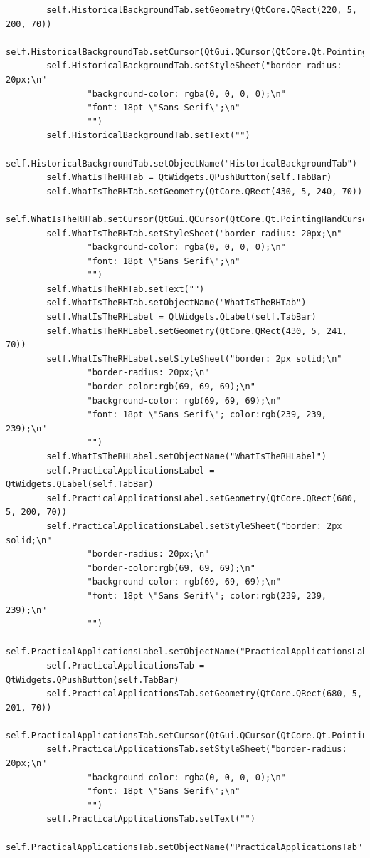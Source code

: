 \documentclass[12pt]{article}
\begin{document}
\begin{lstlisting}
        self.HistoricalBackgroundTab.setGeometry(QtCore.QRect(220, 5, 200, 70))
        self.HistoricalBackgroundTab.setCursor(QtGui.QCursor(QtCore.Qt.PointingHandCursor))
        self.HistoricalBackgroundTab.setStyleSheet("border-radius: 20px;\n"
                "background-color: rgba(0, 0, 0, 0);\n"
                "font: 18pt \"Sans Serif\";\n"
                "")
        self.HistoricalBackgroundTab.setText("")
        self.HistoricalBackgroundTab.setObjectName("HistoricalBackgroundTab")
        self.WhatIsTheRHTab = QtWidgets.QPushButton(self.TabBar)
        self.WhatIsTheRHTab.setGeometry(QtCore.QRect(430, 5, 240, 70))
        self.WhatIsTheRHTab.setCursor(QtGui.QCursor(QtCore.Qt.PointingHandCursor))
        self.WhatIsTheRHTab.setStyleSheet("border-radius: 20px;\n"
                "background-color: rgba(0, 0, 0, 0);\n"
                "font: 18pt \"Sans Serif\";\n"
                "")
        self.WhatIsTheRHTab.setText("")
        self.WhatIsTheRHTab.setObjectName("WhatIsTheRHTab")
        self.WhatIsTheRHLabel = QtWidgets.QLabel(self.TabBar)
        self.WhatIsTheRHLabel.setGeometry(QtCore.QRect(430, 5, 241, 70))
        self.WhatIsTheRHLabel.setStyleSheet("border: 2px solid;\n"
                "border-radius: 20px;\n"
                "border-color:rgb(69, 69, 69);\n"
                "background-color: rgb(69, 69, 69);\n"
                "font: 18pt \"Sans Serif\"; color:rgb(239, 239, 239);\n"
                "")
        self.WhatIsTheRHLabel.setObjectName("WhatIsTheRHLabel")
        self.PracticalApplicationsLabel = QtWidgets.QLabel(self.TabBar)
        self.PracticalApplicationsLabel.setGeometry(QtCore.QRect(680, 5, 200, 70))
        self.PracticalApplicationsLabel.setStyleSheet("border: 2px solid;\n"
                "border-radius: 20px;\n"
                "border-color:rgb(69, 69, 69);\n"
                "background-color: rgb(69, 69, 69);\n"
                "font: 18pt \"Sans Serif\"; color:rgb(239, 239, 239);\n"
                "")
        self.PracticalApplicationsLabel.setObjectName("PracticalApplicationsLabel")
        self.PracticalApplicationsTab = QtWidgets.QPushButton(self.TabBar)
        self.PracticalApplicationsTab.setGeometry(QtCore.QRect(680, 5, 201, 70))
        self.PracticalApplicationsTab.setCursor(QtGui.QCursor(QtCore.Qt.PointingHandCursor))
        self.PracticalApplicationsTab.setStyleSheet("border-radius: 20px;\n"
                "background-color: rgba(0, 0, 0, 0);\n"
                "font: 18pt \"Sans Serif\";\n"
                "")
        self.PracticalApplicationsTab.setText("")
        self.PracticalApplicationsTab.setObjectName("PracticalApplicationsTab")

\end{lstlisting}
\end{document}
